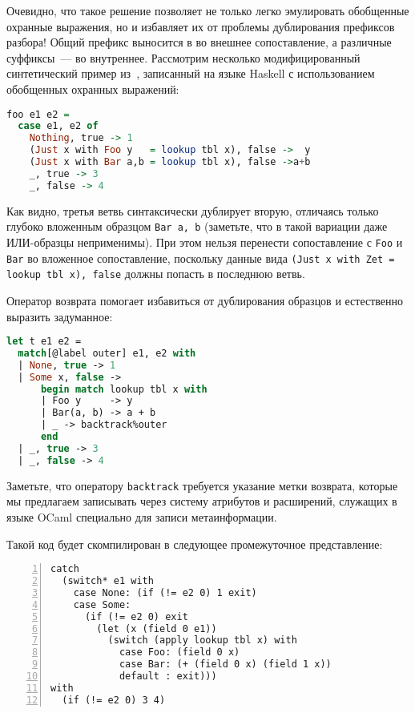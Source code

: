 Очевидно, что такое решение позволяет не только легко эмулировать обобщенные охранные выражения, но и избавляет их от проблемы дублирования префиксов разбора! Общий префикс выносится в во внешнее сопоставление, а различные суффиксы~--- во внутреннее. Рассмотрим несколько модифицированный синтетический пример из~\cite{discuss}, записанный на языке Haskell с использованием обобщенных охранных выражений:

\noindent
\begin{minipage}{\linewidth}
\begin{lstlisting}[language=haskell, escapechar=@]
foo e1 e2 = 
  case e1, e2 of
    Nothing, true -> 1
    (Just x with Foo y   = lookup tbl x), false ->  y
    (Just x with Bar a,b = lookup tbl x), false ->a+b
    _, true -> 3
    _, false -> 4
\end{lstlisting}
\end{minipage}

Как видно, третья ветвь синтаксически дублирует вторую, отличаясь только глубоко вложенным образцом \lstinline[breaklines]|Bar a, b| (заметьте, что в такой вариации даже ИЛИ-образцы неприменимы). При этом нельзя перенести сопоставление с \lstinline|Foo| и \lstinline|Bar| во вложенное сопоставление, поскольку данные вида \lstinline[breaklines=true,language=none]|(Just x with Zet = lookup tbl x), false| \linebreak должны попасть в последнюю ветвь.

Оператор возврата помогает избавиться от дублирования образцов и естественно выразить задуманное:

\noindent
\begin{minipage}{\linewidth}
\begin{lstlisting}[language=ocaml]
let t e1 e2 = 
  match[@label outer] e1, e2 with
  | None, true -> 1
  | Some x, false ->
      begin match lookup tbl x with
      | Foo y     -> y
      | Bar(a, b) -> a + b
      | _ -> backtrack%outer
      end
  | _, true -> 3
  | _, false -> 4
\end{lstlisting}
\end{minipage}

Заметьте, что оператору \lstinline|backtrack| требуется указание метки возврата, которые мы предлагаем записывать через систему атрибутов и расширений, служащих в языке OCaml специально для записи метаинформации.

Такой код будет скомпилирован в следующее промежуточное представление:

\begin{minipage}{\linewidth}
\begin{lstlisting}[language=lambda, numbers=left]
catch
  (switch* e1 with 
    case None: (if (!= e2 0) 1 exit) 
    case Some:
      (if (!= e2 0) exit 
        (let (x (field 0 e1))
          (switch (apply lookup tbl x) with
            case Foo: (field 0 x)
            case Bar: (+ (field 0 x) (field 1 x))
            default : exit)))
with
  (if (!= e2 0) 3 4)
\end{lstlisting}
\end{minipage}

